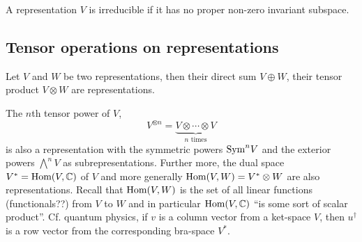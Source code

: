 
\begin{definition}
	A representation $V$ is irreducible if it has no proper non-zero invariant subspace.
\end{definition}


\subsection{Tensor operations on representations}

Let $V$ and $W$ be two representations, then their direct sum $V \oplus W$, their tensor product $V \otimes W$ are representations.

The $n$th tensor power of $V$, \[V^{\otimes n} = \underset{n \text{ times}}{\underbrace{V \otimes \cdots \otimes V}}\] is also a representation with the symmetric powers $\text{Sym}^n V$ and the exterior powers $ \bigwedge^n V$ as subrepresentations. Further more, the dual space $V^* = \text{Hom}(V,\mathbb{C})$ of $V$ and more generally $\text{Hom}(V,W) = V^* \otimes W$ are also representations. Recall that $\text{Hom}(V,W)$ is the set of all linear functions (functionals??) from $V$ to $W$ and in particular $\text{Hom}(V, \mathbb{C})$ ``is some sort of scalar product''. Cf. quantum physics, if $v$ is a column vector from a ket-space $V$, then $u^\dagger$ is a row vector from the corresponding bra-space $V^*$.



